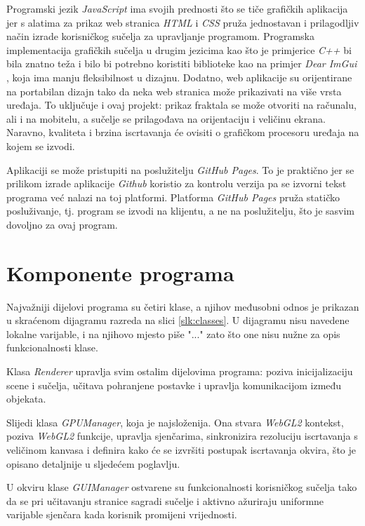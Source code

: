 \documentclass[zavrsnirad, upload]{fer}
\begin{document}
Programski jezik \emph{JavaScript} ima svojih prednosti što se tiče grafičkih aplikacija jer s alatima za prikaz web stranica \emph{HTML} i \emph{CSS} pruža jednostavan i prilagodljiv način izrade korisničkog sučelja za upravljanje programom. Programska implementacija grafičkih sučelja u drugim jezicima kao što je primjerice \emph{C++} bi bila znatno teža i bilo bi potrebno koristiti biblioteke kao na primjer \emph{Dear ImGui} \cite{imgui}, koja ima manju fleksibilnost u dizajnu. Dodatno, web aplikacije su orijentirane na portabilan dizajn tako da neka web stranica može prikazivati na više vrsta uređaja. To uključuje i ovaj projekt: prikaz fraktala se može otvoriti na računalu, ali i na mobitelu, a sučelje se prilagođava na orijentaciju i veličinu ekrana. Naravno, kvaliteta i brzina iscrtavanja će ovisiti o grafičkom procesoru uređaja na kojem se izvodi.

Aplikaciji se može pristupiti na poslužitelju \emph{GitHub Pages}. To je praktično jer se prilikom izrade aplikacije \emph{Github} koristio za kontrolu verzija pa se izvorni tekst programa već nalazi na toj platformi. Platforma \emph{GitHub Pages} pruža statičko posluživanje, tj. program se izvodi na klijentu, a ne na poslužitelju, što je sasvim dovoljno za ovaj program.

\newpage{}

\section{Komponente programa}
\label{podpog:komponente_programa}

Najvažniji dijelovi programa su četiri klase, a njihov međusobni odnos je prikazan u skraćenom dijagramu razreda na slici \ref{slk:classes}. U dijagramu nisu navedene lokalne varijable, i na njihovo mjesto piše "..." zato što one nisu nužne za opis funkcionalnosti klase. 

Klasa \emph{Renderer} upravlja svim ostalim dijelovima programa: poziva inicijalizaciju scene i sučelja, učitava pohranjene postavke i upravlja komunikacijom između objekata. 

Slijedi klasa \emph{GPUManager}, koja je najsloženija. Ona stvara \emph{WebGL2} kontekst, poziva \emph{WebGL2} funkcije, upravlja sjenčarima, sinkronizira rezoluciju iscrtavanja s veličinom kanvasa i definira kako će se izvršiti postupak iscrtavanja okvira, što je opisano detaljnije u sljedećem poglavlju. 

U okviru klase \emph{GUIManager} ostvarene su funkcionalnosti korisničkog sučelja tako da se pri učitavanju stranice sagradi sučelje i aktivno ažuriraju uniformne varijable sjenčara kada korisnik promijeni vrijednosti. 
\end{document}
